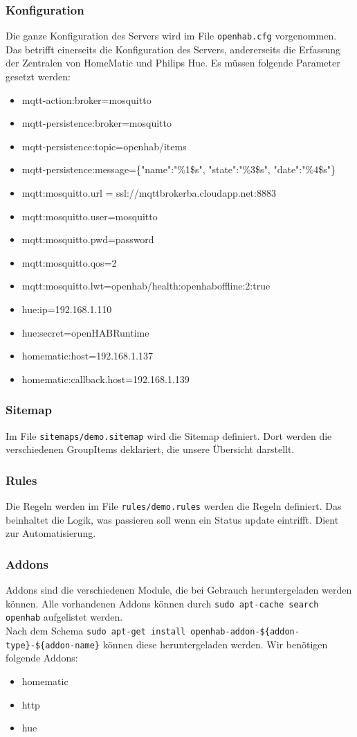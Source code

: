 \subsubsection*{Konfiguration}
Die ganze Konfiguration des Servers wird im File \lstinline!openhab.cfg! vorgenommen. Das betrifft einerseits die Konfiguration des Servers, andererseits die Erfassung der Zentralen von HomeMatic und Philips Hue. Es müssen folgende Parameter gesetzt werden:
\begin{itemize}
	\item mqtt-action:broker=mosquitto
	\item mqtt-persistence:broker=mosquitto
	\item mqtt-persistence:topic=openhab/items
	\item mqtt-persistence:message=\{"name":"\%1\$s", "state":"\%3\$s", "date":"\%4\$s"\}
	\item mqtt:mosquitto.url =  ssl://mqttbrokerba.cloudapp.net:8883
	\item mqtt:mosquitto.user=mosquitto
	\item mqtt:mosquitto.pwd=password
	\item mqtt:mosquitto.qos=2
	\item mqtt:mosquitto.lwt=openhab/health:openhaboffline:2:true
	\item hue:ip=192.168.1.110
	\item hue:secret=openHABRuntime
	\item homematic:host=192.168.1.137
	\item homematic:callback.host=192.168.1.139
\end{itemize}

\subsubsection*{Sitemap}
Im File \lstinline!sitemaps/demo.sitemap! wird die Sitemap definiert. Dort werden die verschiedenen GroupItems deklariert, die unsere Übersicht darstellt.

\subsubsection*{Rules}
Die Regeln werden im File \lstinline!rules/demo.rules! werden die Regeln definiert. Das beinhaltet die Logik, was passieren soll wenn ein Status update eintrifft. Dient zur Automatisierung.

\subsubsection*{Addons}
Addons sind die verschiedenen Module, die bei Gebrauch heruntergeladen werden können. Alle vorhandenen Addons können durch \lstinline!sudo apt-cache search openhab! aufgelistet werden. \\ Nach dem Schema \lstinline!sudo apt-get install openhab-addon-${addon-type}-${addon-name}! können diese heruntergeladen werden. Wir benötigen folgende Addons:
\begin{itemize}
	\item homematic
	\item http
	\item hue
\end{itemize}

